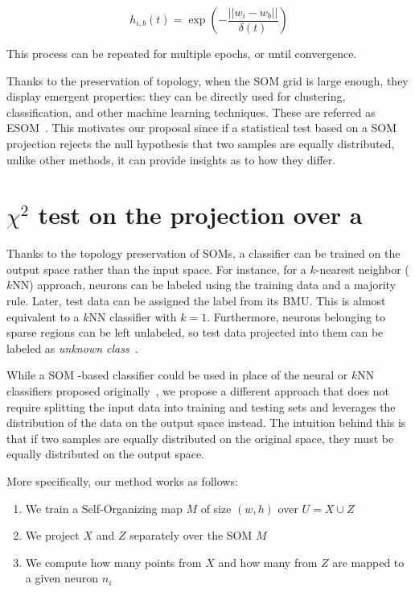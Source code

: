 \begin{equation}
    h_{i,b}(t) = \exp(- \frac{||w_i - w_b||}{\delta(t)})
\end{equation}

This process can be repeated for multiple epochs, or until convergence.

\medskip

Thanks to the preservation of topology, when the \gls{SOM}  grid is large enough,
they display emergent properties: they can be directly used for clustering,
classification, and other machine learning techniques. These are referred as
\gls{ESOM}~\cite{ultsch2005esom}.
This motivates our proposal since if a statistical test based on a \gls{SOM}
projection rejects the null hypothesis that two samples are equally distributed,
unlike other methods, it can provide insights as to how they differ.

\section{\texorpdfstring{$\chi^2$}{χ²} test on the projection over a }
\label{sec:som_chi2}

Thanks to the topology preservation of \glspl{SOM}, a classifier can be trained
on the output space rather than the input space. For instance, for a $k$-nearest neighbor ($k$NN)
approach, neurons can be labeled using the training data and a majority rule. Later, test data
can be assigned the label from its BMU. This is almost equivalent to a $k$NN classifier with $k=1$.
Furthermore, neurons belonging to sparse regions can be left unlabeled, so test data projected
into them can be labeled as \emph{unknown class}~\cite{ultsch2005esom,silva2011som}.

While a \gls{SOM} -based classifier could be used in place of the neural or $k$NN classifiers proposed
originally~\cite{lopez2016revisiting}, we propose a different approach that does not require
splitting the input data into training and testing sets and leverages the distribution of the
data on the output space instead. The intuition behind this is that if two samples are equally
distributed on the original space, they must be equally distributed on the output space.

More specifically, our method works as follows:

\begin{enumerate}
    \item We train a Self-Organizing map $M$ of size $(w, h)$ over $U = X \cup Z$
    \item We project $X$ and $Z$ separately over the \gls{SOM}  $M$
    \item We compute how many points from $X$ and how many from $Z$ are mapped to a given neuron $n_i$
\end{enumerate}

